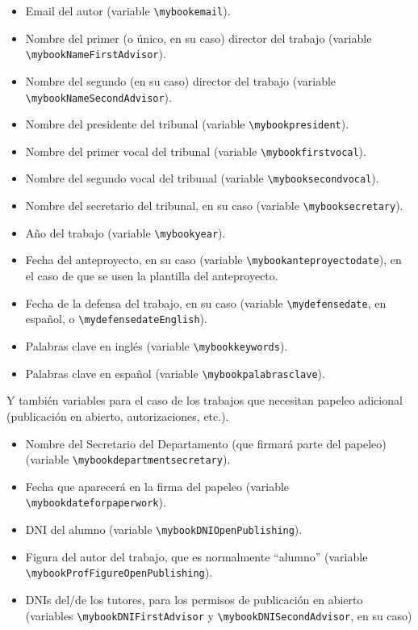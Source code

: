 \begin{itemize}
\item Email del autor (variable \texttt{\textbackslash{}mybookemail}).
\item Nombre del primer (o único, en su caso) director del trabajo
  (variable \texttt{\textbackslash{}mybookNameFirstAdvisor}).
\item Nombre del segundo (en su caso) director del trabajo (variable \texttt{\textbackslash{}mybookNameSecondAdvisor}).
\item Nombre del presidente del tribunal (variable \texttt{\textbackslash{}mybookpresident}).
\item Nombre del primer vocal del tribunal (variable \texttt{\textbackslash{}mybookfirstvocal}).
\item Nombre del segundo vocal del tribunal (variable \texttt{\textbackslash{}mybooksecondvocal}).
\item Nombre del secretario del tribunal, en su caso (variable \texttt{\textbackslash{}mybooksecretary}).
\item Año del trabajo (variable \texttt{\textbackslash{}mybookyear}).
\item Fecha del anteproyecto, en su caso (variable \texttt{\textbackslash{}mybookanteproyectodate}), en el caso de que se usen la plantilla del anteproyecto.
\item Fecha de la defensa del trabajo, en su caso (variable
  \texttt{\textbackslash{}mydefensedate}, en español, o
  \texttt{\textbackslash{}mydefensedateEnglish}).
\item Palabras clave en inglés (variable \texttt{\textbackslash{}mybookkeywords}).
\item Palabras clave en español (variable \texttt{\textbackslash{}mybookpalabrasclave}).
\end{itemize}

Y también variables para el caso de los trabajos que necesitan papeleo
adicional (publicación en abierto, autorizaciones, etc.).

\begin{itemize}
\item Nombre del Secretario del Departamento (que firmará parte del papeleo)
  (variable \texttt{\textbackslash{}mybookdepartmentsecretary}).
\item Fecha que aparecerá en la firma del papeleo (variable \texttt{\textbackslash{}mybookdateforpaperwork}).
\item DNI del alumno (variable
  \texttt{\textbackslash{}mybookDNIOpenPublishing}).
\item Figura del autor del trabajo, que es normalmente ``alumno''
  (variable \texttt{\textbackslash{}mybookProfFigureOpenPublishing}).
\item DNIs del/de los tutores, para los permisos de publicación en
  abierto (variables \texttt{\textbackslash{}mybookDNIFirstAdvisor} y
  \texttt{\textbackslash{}mybookDNISecondAdvisor}, en su caso)
\end{itemize}

